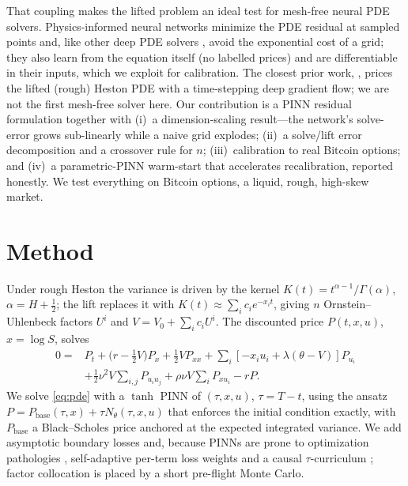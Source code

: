 \documentclass[11pt]{article}
\begin{document}
That coupling makes the lifted problem an ideal test for mesh-free neural PDE
solvers. Physics-informed neural networks minimize the PDE residual at sampled
points \citep{raissi2019physics} and, like other deep PDE solvers
\citep{sirignano2018dgm,han2018solving}, avoid the exponential cost of a grid; they
also learn from the equation itself (no labelled prices) and are differentiable in
their inputs, which we exploit for calibration. The closest prior work,
\citet{papapantoleon2025timestepping}, prices the lifted (rough) Heston PDE with a
time-stepping deep gradient flow; we are not the first mesh-free solver here. Our
contribution is a PINN residual formulation together with (i)~a dimension-scaling
result---the network's solve-error grows sub-linearly while a naive grid explodes;
(ii)~a solve/lift error decomposition and a crossover rule for $n$;
(iii)~calibration to real Bitcoin options; and (iv)~a parametric-PINN warm-start
that accelerates recalibration, reported honestly. We test everything on Bitcoin
options, a liquid, rough, high-skew market.

\section{Method}
Under rough Heston the variance is driven by the kernel
$K(t)=t^{\alpha-1}/\Gamma(\alpha)$, $\alpha=H+\tfrac12$; the lift replaces it with
$K(t)\approx\sum_i c_i e^{-x_i t}$, giving $n$ Ornstein--Uhlenbeck factors $U^i$
and $V=V_0+\sum_i c_i U^i$. The discounted price $P(t,x,u)$, $x=\log S$, solves
\begin{align}
0 = {}& P_t + \big(r-\tfrac12 V\big)P_x + \tfrac12 V P_{xx}
   + \textstyle\sum_i[-x_i u_i + \lambda(\theta-V)]P_{u_i}\nonumber\\
   &+ \tfrac12\nu^2 V\textstyle\sum_{i,j}P_{u_i u_j} + \rho\nu V\textstyle\sum_i P_{xu_i} - rP .
\label{eq:pde}
\end{align}
We solve \eqref{eq:pde} with a $\tanh$ PINN of $(\tau,x,u)$, $\tau=T-t$, using the
ansatz $P=P_{\mathrm{base}}(\tau,x)+\tau N_\theta(\tau,x,u)$ that enforces the
initial condition exactly, with $P_{\mathrm{base}}$ a Black--Scholes price anchored
at the expected integrated variance. We add asymptotic boundary losses and,
because PINNs are prone to optimization pathologies
\citep{krishnapriyan2021characterizing,wang2022when}, self-adaptive per-term loss
weights \citep{kendall2018multitask,mcclenny2023self} and a causal
$\tau$-curriculum \citep{wang2024respecting}; factor collocation is placed by a
short pre-flight Monte Carlo.
\end{document}

